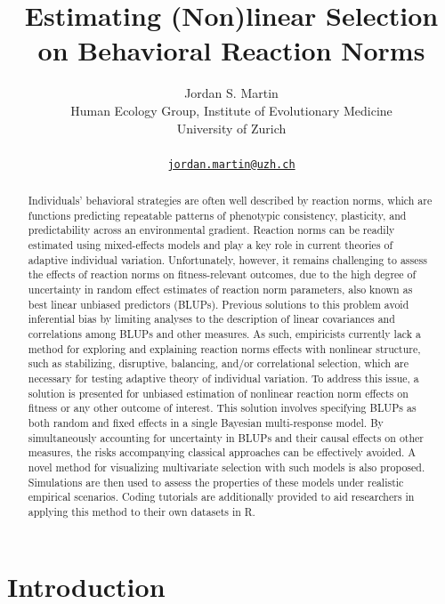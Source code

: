 \documentclass{article}
\title{Estimating (Non)linear Selection on \linebreak Behavioral
Reaction Norms}
\author{
    Jordan S. Martin
   \\
    Human Ecology Group, Institute of Evolutionary Medicine \\
    University of Zurich \\
   \\
  \texttt{\href{mailto:jordan.martin@uzh.ch}{\nolinkurl{jordan.martin@uzh.ch}}} \\
  }
\begin{document}
\maketitle

\def\tightlist{}


\begin{abstract}
Individuals' behavioral strategies are often well described by reaction
norms, which are functions predicting repeatable patterns of phenotypic
consistency, plasticity, and predictability across an environmental
gradient. Reaction norms can be readily estimated using mixed-effects
models and play a key role in current theories of adaptive individual
variation. Unfortunately, however, it remains challenging to assess the
effects of reaction norms on fitness-relevant outcomes, due to the high
degree of uncertainty in random effect estimates of reaction norm
parameters, also known as best linear unbiased predictors (BLUPs).
Previous solutions to this problem avoid inferential bias by limiting
analyses to the description of linear covariances and correlations among
BLUPs and other measures. As such, empiricists currently lack a method
for exploring and explaining reaction norms effects with nonlinear
structure, such as stabilizing, disruptive, balancing, and/or
correlational selection, which are necessary for testing adaptive theory
of individual variation. To address this issue, a solution is presented
for unbiased estimation of nonlinear reaction norm effects on fitness or
any other outcome of interest. This solution involves specifying BLUPs
as both random and fixed effects in a single Bayesian multi-response
model. By simultaneously accounting for uncertainty in BLUPs and their
causal effects on other measures, the risks accompanying classical
approaches can be effectively avoided. A novel method for visualizing
multivariate selection with such models is also proposed. Simulations
are then used to assess the properties of these models under realistic
empirical scenarios. Coding tutorials are additionally provided to aid
researchers in applying this method to their own datasets in R.
\end{abstract}


\hypertarget{introduction}{%
\section{Introduction}\label{introduction}}
\end{document}
